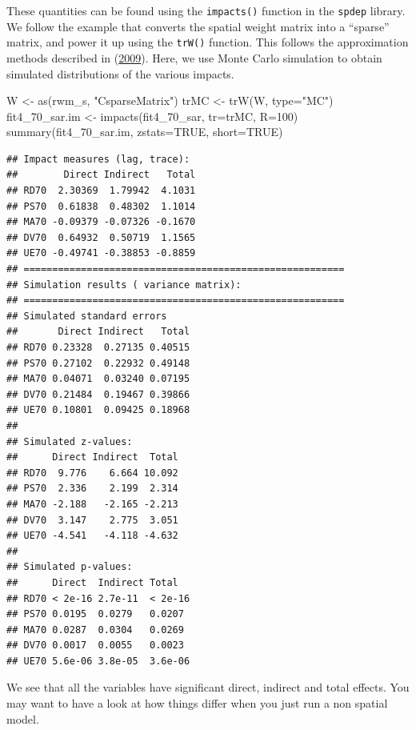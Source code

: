 \documentclass[
  krantz2]{krantz}
\makeatletter
\newenvironment{Shaded}{\begin{snugshade}}{\end{snugshade}}
\newcommand{\AttributeTok}[1]{\textcolor[rgb]{0.61,0.61,0.61}{#1}}
\newcommand{\ConstantTok}[1]{\textcolor[rgb]{0,0,0}{#1}}
\newcommand{\DecValTok}[1]{\textcolor[rgb]{0.06,0.06,0.06}{#1}}
\newcommand{\FunctionTok}[1]{\textcolor[rgb]{0,0,0}{#1}}
\newcommand{\NormalTok}[1]{#1}
\newcommand{\OtherTok}[1]{\textcolor[rgb]{0.37,0.37,0.37}{#1}}
\newcommand{\StringTok}[1]{\textcolor[rgb]{0.5,0.5,0.5}{#1}}
\newenvironment{kframe}{%
\medskip{}
\setlength{\fboxsep}{.8em}
 \def\at@end@of@kframe{}%
 \ifinner\ifhmode%
  \def\at@end@of@kframe{\end{minipage}}%
  \begin{minipage}{\columnwidth}%
 \fi\fi%
 \def\FrameCommand##1{\hskip\@totalleftmargin \hskip-\fboxsep
 \colorbox{shadecolor}{##1}\hskip-\fboxsep
     \hskip-\linewidth \hskip-\@totalleftmargin \hskip\columnwidth}%
 \MakeFramed {\advance\hsize-\width
   \@totalleftmargin\z@ \linewidth\hsize
   \@setminipage}}%
 {\par\unskip\endMakeFramed%
 \at@end@of@kframe}
\renewenvironment{Shaded}{\begin{kframe}}{\end{kframe}}
\makeatother
\begin{document}
These quantities can be found using the \texttt{impacts()} function in the \texttt{spdep} library. We follow the example that converts the spatial weight matrix into a ``sparse'' matrix, and power it up using the \texttt{trW()} function. This follows the approximation methods described in (\protect\hyperlink{ref-LeSage_2009}{2009}). Here, we use Monte Carlo simulation to obtain simulated distributions of the various impacts.

\begin{Shaded}
\begin{Highlighting}[]
\NormalTok{W }\OtherTok{\textless{}{-}} \FunctionTok{as}\NormalTok{(rwm\_s, }\StringTok{"CsparseMatrix"}\NormalTok{)}
\NormalTok{trMC }\OtherTok{\textless{}{-}} \FunctionTok{trW}\NormalTok{(W, }\AttributeTok{type=}\StringTok{"MC"}\NormalTok{)}
\NormalTok{fit4\_70\_sar.im }\OtherTok{\textless{}{-}} \FunctionTok{impacts}\NormalTok{(fit4\_70\_sar, }\AttributeTok{tr=}\NormalTok{trMC, }\AttributeTok{R=}\DecValTok{100}\NormalTok{)}
\FunctionTok{summary}\NormalTok{(fit4\_70\_sar.im, }\AttributeTok{zstats=}\ConstantTok{TRUE}\NormalTok{, }\AttributeTok{short=}\ConstantTok{TRUE}\NormalTok{)}
\end{Highlighting}
\end{Shaded}

\begin{verbatim}
## Impact measures (lag, trace):
##        Direct Indirect   Total
## RD70  2.30369  1.79942  4.1031
## PS70  0.61838  0.48302  1.1014
## MA70 -0.09379 -0.07326 -0.1670
## DV70  0.64932  0.50719  1.1565
## UE70 -0.49741 -0.38853 -0.8859
## ========================================================
## Simulation results ( variance matrix):
## ========================================================
## Simulated standard errors
##       Direct Indirect   Total
## RD70 0.23328  0.27135 0.40515
## PS70 0.27102  0.22932 0.49148
## MA70 0.04071  0.03240 0.07195
## DV70 0.21484  0.19467 0.39866
## UE70 0.10801  0.09425 0.18968
## 
## Simulated z-values:
##      Direct Indirect  Total
## RD70  9.776    6.664 10.092
## PS70  2.336    2.199  2.314
## MA70 -2.188   -2.165 -2.213
## DV70  3.147    2.775  3.051
## UE70 -4.541   -4.118 -4.632
## 
## Simulated p-values:
##      Direct  Indirect Total  
## RD70 < 2e-16 2.7e-11  < 2e-16
## PS70 0.0195  0.0279   0.0207 
## MA70 0.0287  0.0304   0.0269 
## DV70 0.0017  0.0055   0.0023 
## UE70 5.6e-06 3.8e-05  3.6e-06
\end{verbatim}

We see that all the variables have significant direct, indirect and total effects. You may want to have a look at how things differ when you just run a non spatial model.
\end{document}
